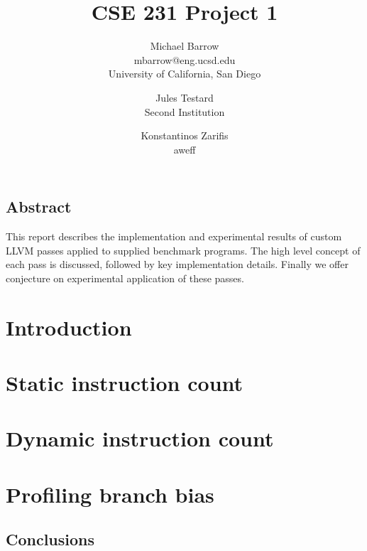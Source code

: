 \documentclass[letterpaper,twocolumn,10pt]{article}
\begin{document}
\date{}

\title{\Large \bf CSE 231 Project 1}

\author{
{\rm Michael Barrow}\\
mbarrow@eng.ucsd.edu\\
University of California, San Diego
\and
{\rm Jules Testard}\\
Second Institution
\and
{Konstantinos Zarifis}\\
aweff
}

\maketitle

\thispagestyle{empty}


\subsection*{Abstract}
This report describes the implementation and experimental results of custom LLVM passes applied to supplied benchmark programs. The high level concept of each pass is discussed, followed by key implementation details. Finally we offer conjecture on experimental application of these passes. %

\section{Introduction}


 
\section{Static instruction count}



\section{Dynamic instruction count}



\section{Profiling branch bias}



\subsection{Conclusions}



{\footnotesize 
}

\theendnotes
\end{document}
